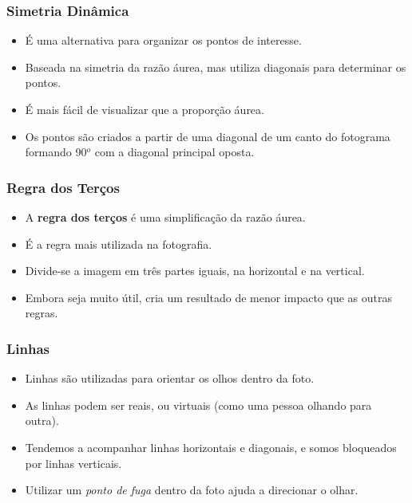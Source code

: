 
\begin{frame}
    \frametitle{Simetria Dinâmica}
    \begin{itemize}
      \item É uma alternativa para organizar os pontos de interesse.
      \item Baseada na simetria da razão áurea, mas utiliza diagonais para determinar os pontos.
      \item É mais fácil de visualizar que a proporção áurea.
      \item Os pontos são criados a partir de uma diagonal de um canto do fotograma formando 90$^o$
      com a diagonal principal oposta.
    \end{itemize}
\end{frame}


\begin{frame}
    \frametitle{Regra dos Terços}
    \begin{itemize}
      \item A \textbf{regra dos terços} é uma simplificação da razão áurea.
      \item É a regra mais utilizada na fotografia.
      \item Divide-se a imagem em três partes iguais, na horizontal e na vertical.
      \item Embora seja muito útil, cria um resultado de menor impacto que as outras regras.
    \end{itemize}
\end{frame}


\begin{frame}
    \frametitle{Linhas}
    \begin{itemize}
      \item Linhas são utilizadas para orientar os olhos dentro da foto.
      \item As linhas podem ser reais, ou virtuais (como uma pessoa olhando para outra).
      \item Tendemos a acompanhar linhas horizontais e diagonais, e somos bloqueados por linhas verticais.
      \item Utilizar um \textit{ponto de fuga} dentro da foto ajuda a direcionar o olhar.
    \end{itemize}
\end{frame}

